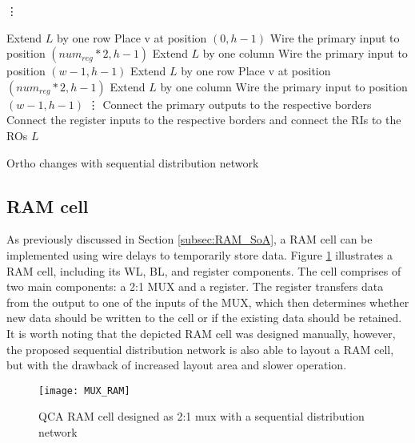 \begin{algorithm}[H]
	\vdots
	
	\begin{algorithmic}
		{
			\State Extend $L$ by one row
			\State Place v at position $(0, h - 1)$
			\State Wire the primary input to position $(num_{reg}*2, h - 1)$ 
			\State Extend $L$ by one column
			\State Wire the primary input to position $(w - 1, h - 1)$ 
			\EndIf
		}
		{
			\State Extend $L$ by one row
			\State Place v at position $(num_{reg}*2, h - 1)$
			\State Extend $L$ by one column
			\State Wire the primary input to position $(w - 1, h - 1)$ 
			\EndIf
		}
		\State\vdots
		\EndIf
		\State Connect the primary outputs to the respective borders
		\State Connect the register inputs to the respective borders and connect the RIs to the ROs
		\Return $L$
		
		
	\end{algorithmic}
	\caption{Ortho changes with sequential distribution network}\label{alg:seq_network}
\end{algorithm}

\subsection{RAM cell}
As previously discussed in Section \ref{subsec:RAM_SoA}, a RAM cell can be implemented using wire delays to temporarily store data. Figure \ref{fig:QCA_RAM} illustrates a RAM cell, including its WL, BL, and register components. The cell comprises of two main components: a 2:1 MUX and a register. The register transfers data from the output to one of the inputs of the MUX, which then determines whether new data should be written to the cell or if the existing data should be retained. It is worth noting that the depicted RAM cell was designed manually, however, the proposed sequential distribution network is also able to layout a RAM cell, but with the drawback of increased layout area and slower operation.

\begin{figure}
	\centering
	\texttt{[image: MUX\_RAM]}
	
	\caption{QCA RAM cell designed as 2:1 mux with a sequential distribution network}\label{fig:QCA_RAM}
\end{figure}